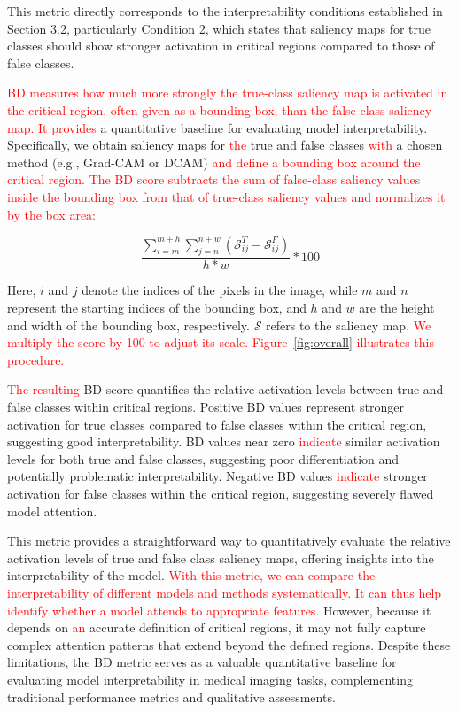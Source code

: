 \documentclass[preprint,7pt, a4paper]{elsarticle}
\begin{document}
This metric directly corresponds to the interpretability conditions established in Section 3.2, particularly Condition 2, which states that saliency maps for true classes should show stronger activation in critical regions compared to those of false classes.

\textcolor{red}{BD measures how much more strongly the true-class saliency map is activated in the critical region, often given as a bounding box, than the false-class saliency map. It provides} a quantitative baseline for evaluating model interpretability. Specifically, we obtain saliency maps for \textcolor{red}{the} true and false classes \textcolor{red}{with} a chosen method (e.g., Grad-CAM or DCAM) \textcolor{red}{and define a bounding box around the critical region. The BD score subtracts the sum of false-class saliency values inside the bounding box from that of true-class saliency values and normalizes it by the box area:}


\begin{equation}
    \frac{\sum_{i=m}^{m+h}\sum_{j=n}^{n+w} (\mathcal{S}_{ij}^T - \mathcal{S}_{ij}^{F})}{h * w} * 100
\end{equation}

Here, $i$ and $j$ denote the indices of the pixels in the image, while $m$ and $n$ represent the starting indices of the bounding box, and $h$ and $w$ are the height and width of the bounding box, respectively. $\mathcal{S}$ refers to the saliency map. \textcolor{red}{We multiply the score by 100 to adjust its scale. Figure~\ref{fig:overall} illustrates this procedure.}

\textcolor{red}{The resulting} BD score quantifies the relative activation levels between true and false classes within critical regions. Positive BD values represent stronger activation for true classes compared to false classes within the critical region, suggesting good interpretability. BD values near zero \textcolor{red}{indicate} similar activation levels for both true and false classes, suggesting poor differentiation and potentially problematic interpretability. Negative BD values \textcolor{red}{indicate} stronger activation for false classes within the critical region, suggesting severely flawed model attention.

This metric provides a straightforward way to quantitatively evaluate the relative activation levels of true and false class saliency maps, offering insights into the interpretability of the model. \textcolor{red}{With this metric, we can compare the interpretability of different models and methods systematically. It can thus help identify whether a model attends to appropriate features.} However, because it depends on \textcolor{red}{an} accurate definition of critical regions, it may not fully capture complex attention patterns that extend beyond the defined regions. Despite these limitations, the BD metric serves as a valuable quantitative baseline for evaluating model interpretability in medical imaging tasks, complementing traditional performance metrics and qualitative assessments.
\end{document}

